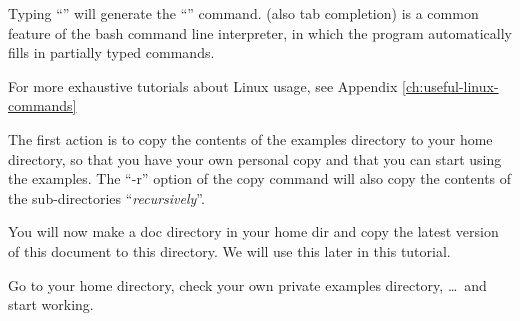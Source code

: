 \begin{prompt}
\end{prompt}

\begin{tip}
Typing ``'' will generate the
``'' command. (also tab completion) is a common feature of the bash command line
interpreter, in which the program automatically fills in partially typed
commands.
\end{tip}

\begin{tip}
For more exhaustive tutorials about Linux usage, see Appendix \ref{ch:useful-linux-commands}
\end{tip}

The first action is to copy the contents of the \hpc examples directory
to your home directory, so that you have your own personal copy and that
you can start using the examples. The ``-r'' option of the copy command
will also copy the contents of the sub-directories ``\emph{recursively}''.

\begin{prompt}
\end{prompt}
\ifgent
You will now make a doc directory in your home dir and copy the latest version of this document to this directory. We will use this later in this tutorial.
\begin{prompt}
\end{prompt}

Go to your home directory, check your own private examples directory, \dots\
and start working.

\begin{prompt}
\end{prompt}


